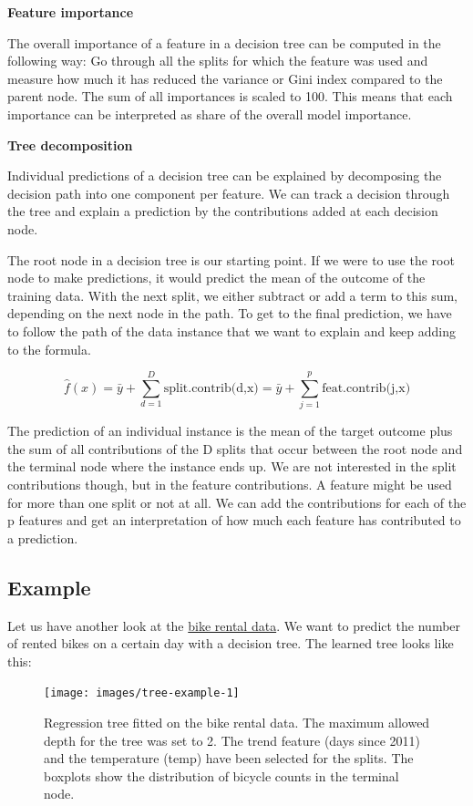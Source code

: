 \documentclass[
  12pt,
]{krantz}
\begin{document}
\textbf{Feature importance}

The overall importance of a feature in a decision tree can be computed in the following way:
Go through all the splits for which the feature was used and measure how much it has reduced the variance or Gini index compared to the parent node.
The sum of all importances is scaled to 100.
This means that each importance can be interpreted as share of the overall model importance.

\textbf{Tree decomposition}

Individual predictions of a decision tree can be explained by decomposing the decision path into one component per feature.
We can track a decision through the tree and explain a prediction by the contributions added at each decision node.

The root node in a decision tree is our starting point.
If we were to use the root node to make predictions, it would predict the mean of the outcome of the training data.
With the next split, we either subtract or add a term to this sum, depending on the next node in the path.
To get to the final prediction, we have to follow the path of the data instance that we want to explain and keep adding to the formula.

\[\hat{f}(x)=\bar{y}+\sum_{d=1}^D\text{split.contrib(d,x)}=\bar{y}+\sum_{j=1}^p\text{feat.contrib(j,x)}\]

The prediction of an individual instance is the mean of the target outcome plus the sum of all contributions of the D splits that occur between the root node and the terminal node where the instance ends up.
We are not interested in the split contributions though, but in the feature contributions.
A feature might be used for more than one split or not at all.
We can add the contributions for each of the p features and get an interpretation of how much each feature has contributed to a prediction.

\hypertarget{example-2}{%
\subsection{Example}\label{example-2}}

Let us have another look at the \protect\hyperlink{bike-data}{bike rental data}.
We want to predict the number of rented bikes on a certain day with a decision tree.
The learned tree looks like this:

\begin{figure}

{\centering \texttt{[image: images/tree-example-1]} 

}

\caption{Regression tree fitted on the bike rental data. The maximum allowed depth for the tree was set to 2. The trend feature (days since 2011) and the temperature (temp) have been selected for the splits. The boxplots show the distribution of bicycle counts in the terminal node.}\label{fig:tree-example}
\end{figure}
\end{document}
